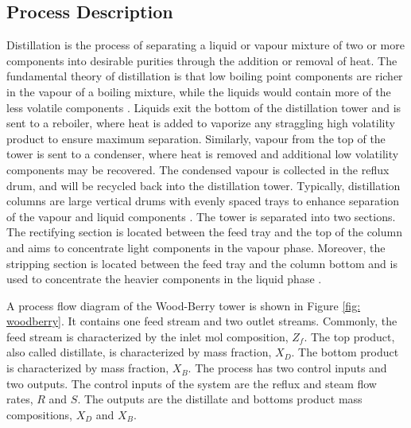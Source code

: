 \subsection{Process Description}
Distillation is the process of separating a liquid or vapour mixture of two or more components into desirable purities through the addition or removal of heat. The fundamental theory of distillation is that low boiling point components are richer in the vapour of a boiling mixture, while the liquids would contain more of the less volatile components \cite{distillation_intro}.  Liquids exit the bottom of the distillation tower and is sent to a reboiler, where heat is added to vaporize any straggling high volatility product to ensure maximum separation. Similarly, vapour from the top of the tower is sent to a condenser, where heat is removed and additional low volatility components may be recovered. The condensed vapour is collected in the reflux drum, and will be recycled back into the distillation tower. Typically, distillation columns are large vertical drums with evenly spaced trays to enhance separation of the vapour and liquid components \cite{mpc_for_distillation_tower}.  The tower is separated into two sections.  The rectifying section is located between the feed tray and the top of the column and aims to concentrate light components in the vapour phase.  Moreover, the stripping section is located between the feed tray and the column bottom and is used to concentrate the heavier components in the liquid phase \cite{henry_distillation}.

A process flow diagram of the Wood-Berry tower is shown in Figure \ref{fig: woodberry}.  It contains one feed stream and two outlet streams.  Commonly, the feed stream is characterized by the inlet mol composition, $Z_f$.  The top product, also called distillate, is characterized by mass fraction, $X_D$.  The bottom product is characterized by mass fraction, $X_B$.  The process has two control inputs and two outputs. The control inputs of the system are the reflux and steam flow rates, $R$ and $S$.  The outputs are the distillate and bottoms product mass compositions, $X_D$ and $X_B$.

